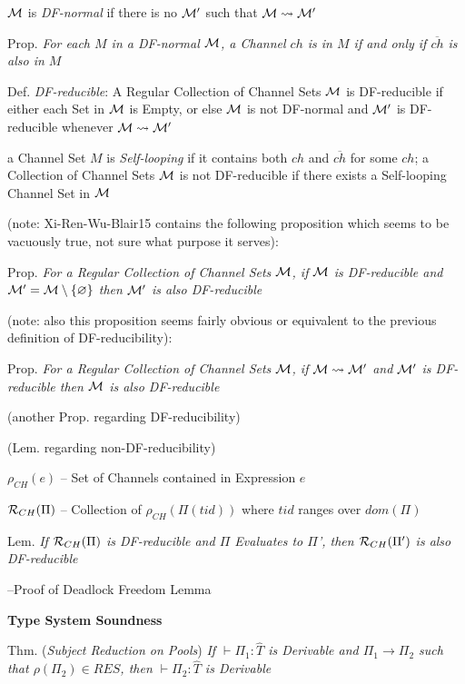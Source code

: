 $\mathcal{M}$ is \emph{DF-normal} if there is no $\mathcal{M}'$ such that
$\mathcal{M} \rightsquigarrow \mathcal{M}'$

Prop. \emph{For each $M$ in a DF-normal $\mathcal{M}$, a Channel $ch$ is
  in $M$ if and only if $\overline{ch}$ is also in $M$}

Def. \emph{DF-reducible}: A Regular Collection of Channel Sets
$\mathcal{M}$ is DF-reducible if either each Set in $\mathcal{M}$ is
Empty, or else $\mathcal{M}$ is not DF-normal and $\mathcal{M}'$ is
DF-reducible whenever $\mathcal{M} \rightsquigarrow \mathcal{M}'$

a Channel Set $M$ is \emph{Self-looping} if it contains both $ch$ and
$\overline{ch}$ for some $ch$; a Collection of Channel Sets
$\mathcal{M}$ is not DF-reducible if there exists a Self-looping Channel
Set in $\mathcal{M}$

(note: Xi-Ren-Wu-Blair15 contains the following proposition which
seems to be vacuously true, not sure what purpose it serves):

Prop. \emph{For a Regular Collection of Channel Sets $\mathcal{M}$, if
  $\mathcal{M}$ is DF-reducible and $\mathcal{M}' =
  \mathcal{M}\setminus\{\varnothing\}$ then $\mathcal{M}'$ is also
  DF-reducible}

(note: also this proposition seems fairly obvious or equivalent to the
previous definition of DF-reducibility):

Prop. \emph{For a Regular Collection of Channel Sets $\mathcal{M}$, if
  $\mathcal{M} \rightsquigarrow \mathcal{M}'$ and $\mathcal{M}'$ is
  DF-reducible then $\mathcal{M}$ is also DF-reducible}

(another Prop. regarding DF-reducibility) %

(Lem. regarding non-DF-reducibility) %

$\rho_{CH}(e)$ -- Set of Channels contained in Expression $e$

$\mathcal{R}_{CH}(\Pi)$ -- Collection of $\rho_{CH}(\Pi(tid))$ where
$tid$ ranges over $dom(\Pi)$

Lem. \emph{If $\mathcal{R}_{CH}(\Pi)$ is DF-reducible and $\Pi$
  Evaluates to $\Pi$', then $\mathcal{R}_{CH}(\Pi')$ is also
  DF-reducible}

--Proof of Deadlock Freedom Lemma


\textbf{Type System Soundness}

Thm. (\emph{Subject Reduction on Pools}) \emph{If $\vdash \Pi_1 :
  \hat{T}$ is Derivable and $\Pi_1 \rightarrow \Pi_2$ such that
  $\rho(\Pi_2) \in RES$, then $\vdash \Pi_2 : \hat{T}$ is Derivable}

